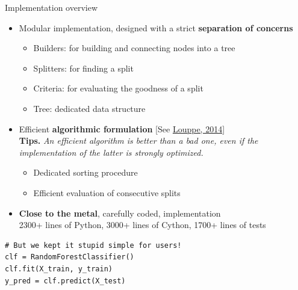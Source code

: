 \documentclass{beamer}
\begin{document}
\begin{frame}[fragile]{Implementation overview}

\begin{itemize}
\item Modular implementation, designed with a strict {\bf separation of concerns}
  \begin{itemize}
    \item Builders: for building and connecting nodes into a tree
    \item Splitters: for finding a split
    \item Criteria: for evaluating the goodness of a split
    \item Tree: dedicated data structure
  \end{itemize}
\item Efficient {\bf algorithmic formulation} [See \href{http://arxiv.org/abs/1407.7502}{Louppe, 2014}]\\
  {\bf Tips.} \textit{An efficient algorithm is better than a bad one, even if the implementation of the latter is strongly optimized.}
  \begin{itemize}
    \item Dedicated sorting procedure
    \item Efficient evaluation of consecutive splits
  \end{itemize}
\item {\bf Close to the metal}, carefully coded, implementation\\
  {\small 2300+ lines of Python, 3000+ lines of Cython, 1700+ lines of tests}

\end{itemize}

\vspace{0.1cm}

\begin{verbatim}
# But we kept it stupid simple for users!
clf = RandomForestClassifier()
clf.fit(X_train, y_train)
y_pred = clf.predict(X_test)
\end{verbatim}

\end{frame}

\end{document}
